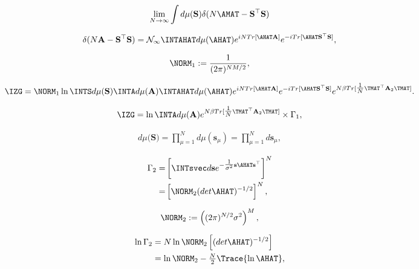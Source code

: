 \begin{align}
  \lim_{N\rightarrow\infty} \int d\mu(\mathbf{S})    \delta(N\AMAT-\mathbf{S}^{\top}\mathbf{S})
\end{align}

\begin{align}
\delta(N\mathbf{A}-\mathbf{S^{\top}S})
   =\mathcal{N_1}\INTAHAT  d\mu(\AHAT) e^{ iN Tr[\AHAT\mathbf{A}] } e^{ -i Tr[\AHAT\mathbf{S^{\top}S}] }  ,
\end{align}

\begin{align}
  \label{eqn:norm_1}
\NORM_1:=\frac{1}{(2\pi)^{NM/2}},
\end{align}

\begin{align}
\label{eqn:Q2}
\IZG = \NORM_1 \ln\INTS  d\mu(\mathbf{S}) \INTA d\mu(\mathbf{A}) 
                           \INTAHAT d\mu(\AHAT) e^{ iN Tr[ \AHAT\mathbf{A} ] }
                           e^{ -i Tr[ \AHAT\mathbf{S}^{\top} \mathbf{S} ] }
                           e^{  N\beta Tr[\tfrac{1}{N} \TMAT^{\top}\mathbf{A}_{2}\TMAT ] } .
\end{align}

\begin{align}
\label{eqn:IZG_Gamma1}
\IZG =  \ln\INTA  d\mu(\mathbf{A}) 
            e^{  N\beta Tr[\tfrac{1}{N} \TMAT^{\top}\mathbf{A}_{2}\TMAT ] } \times
           \Gamma_1  ,
\end{align}

\begin{align}
\label{eqn:dMuS}
d\mu(\mathbf{S)} = \prod_{\mu=1}^{N}d\mu(\mathbf{s}_{\mu})=\prod_{\mu=1}^{N}d\mathbf{s}_{\mu} ,
\end{align}

\begin{align}
\label{eqn:int-out-J2}
\Gamma_2 
   =& \left[\INTsvec d\mathbf{s}e^{-\tfrac{1}{\sigma^{2}} \mathbf{s}\AHAT\mathbf{s}^{\top} }\right]^{N} \\
   =& \left[\NORM_2 (det \AHAT)^{-1/2}\right]^{{N}}  ,
\end{align}

\begin{align}
\label{eqn:norm_2}
\NORM_2 := \left((2\pi)^{N/2}\sigma^{2}\right)^{M}  ,
\end{align}

\begin{align}
\nonumber
\ln\Gamma_2 
   &=N\ln\NORM_2\left[( det \AHAT)^{-1/2} \right]  \\  \nonumber %
&= \ln\NORM_2 -\tfrac{N}{2}\Trace{ \ln\AHAT }  ,
\end{align}

